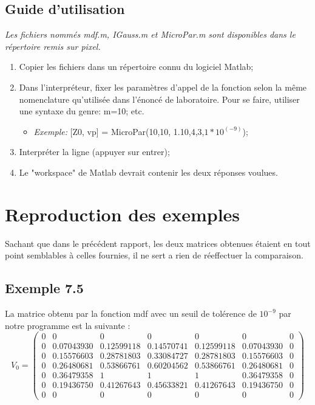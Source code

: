 \subsection{Guide d'utilisation}

\textit{Les fichiers nommés mdf.m, IGauss.m et MicroPar.m sont disponibles dans le répertoire remis sur pixel.}
\begin{enumerate}
\item Copier les fichiers dans un répertoire connu du logiciel Matlab;
\item Dans l'interpréteur, fixer les paramètres d'appel de la fonction selon la même nomenclature qu'utilisée dans l'énoncé de laboratoire. Pour se faire, utiliser une syntaxe du genre: m=10; etc. 
\begin{itemize}
\item \textit{Exemple:} [Z0, vp] = MicroPar(10,10, 1.10,4,3,$1*10^{(-9)}$);
\end{itemize}
\item Interpréter la ligne (appuyer sur entrer);
\item Le "workspace" de Matlab devrait contenir les deux réponses voulues.
\end{enumerate}

\section{Reproduction des exemples}
Sachant que dans le précédent rapport, les deux matrices obtenues étaient en tout point semblables à celles fournies, il ne sert a rien de réeffectuer la comparaison.
\subsection{Exemple 7.5}

La matrice obtenu par la fonction mdf avec un seuil de tolérence de $10^{-9}$ par notre programme est la suivante :
\[V_0  = \left(\begin{array}{ccccccc}
0 & 0 			& 0 			& 0 			& 0 			& 0 			& 0 \\
0 & 0.07043930 	& 0.12599118 	& 0.14570741	& 0.12599118	& 0.07043930 	& 0 \\
0 & 0.15576603 	& 0.28781803 	& 0.33084727 	& 0.28781803 	& 0.15576603 	& 0 \\
0 & 0.26480681 	& 0.53866761 	& 0.60204562  	& 0.53866761 	& 0.26480681 	& 0 \\
0 & 0.36479358 	& 1				& 1				& 1			 	& 0.36479358 	& 0 \\
0 & 0.19436750 	& 0.41267643 	& 0.45633821	& 0.41267643 	& 0.19436750 	& 0 \\
0 & 0 			& 0 			& 0 			& 0 			& 0 			& 0 
\end{array} \right)\]

